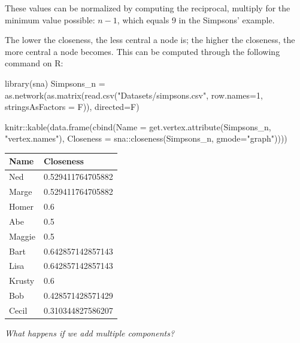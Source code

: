 \documentclass[
  notitlepage,
  onecolumn,
  openany]{book}
\newenvironment{Shaded}{\begin{snugshade}}{\end{snugshade}}
\newcommand{\AttributeTok}[1]{\textcolor[rgb]{0.77,0.63,0.00}{#1}}
\newcommand{\DecValTok}[1]{\textcolor[rgb]{0.00,0.00,0.81}{#1}}
\newcommand{\FunctionTok}[1]{\textcolor[rgb]{0.00,0.00,0.00}{#1}}
\newcommand{\NormalTok}[1]{#1}
\newcommand{\OtherTok}[1]{\textcolor[rgb]{0.56,0.35,0.01}{#1}}
\newcommand{\SpecialCharTok}[1]{\textcolor[rgb]{0.00,0.00,0.00}{#1}}
\newcommand{\StringTok}[1]{\textcolor[rgb]{0.31,0.60,0.02}{#1}}
\begin{document}
These values can be normalized by computing the reciprocal, multiply for the minimum value possible: \(n-1\), which equals 9 in the Simpsons' example.

The lower the closeness, the less central a node is; the higher the closeness, the more central a node becomes. This can be computed through the following command on R:

\begin{Shaded}
\begin{Highlighting}[]
\FunctionTok{library}\NormalTok{(sna)}
\NormalTok{Simpsons\_n }\OtherTok{=} \FunctionTok{as.network}\NormalTok{(}\FunctionTok{as.matrix}\NormalTok{(}\FunctionTok{read.csv}\NormalTok{(}\StringTok{"Datasets/simpsons.csv"}\NormalTok{, }
                                           \AttributeTok{row.names=}\DecValTok{1}\NormalTok{, }
                                           \AttributeTok{stringsAsFactors =}\NormalTok{ F)),}
                        \AttributeTok{directed=}\NormalTok{F)}

\NormalTok{knitr}\SpecialCharTok{::}\FunctionTok{kable}\NormalTok{(}\FunctionTok{data.frame}\NormalTok{(}\FunctionTok{cbind}\NormalTok{(}\AttributeTok{Name =} \FunctionTok{get.vertex.attribute}\NormalTok{(Simpsons\_n, }\StringTok{"vertex.names"}\NormalTok{),}
                 \AttributeTok{Closeness =}\NormalTok{ sna}\SpecialCharTok{::}\FunctionTok{closeness}\NormalTok{(Simpsons\_n, }\AttributeTok{gmode=}\StringTok{"graph"}\NormalTok{))))}
\end{Highlighting}
\end{Shaded}

\begin{tabular}{l|l}
\hline
Name & Closeness\\
\hline
Ned & 0.529411764705882\\
\hline
Marge & 0.529411764705882\\
\hline
Homer & 0.6\\
\hline
Abe & 0.5\\
\hline
Maggie & 0.5\\
\hline
Bart & 0.642857142857143\\
\hline
Lisa & 0.642857142857143\\
\hline
Krusty & 0.6\\
\hline
Bob & 0.428571428571429\\
\hline
Cecil & 0.310344827586207\\
\hline
\end{tabular}

\emph{What happens if we add multiple components?}
\end{document}
